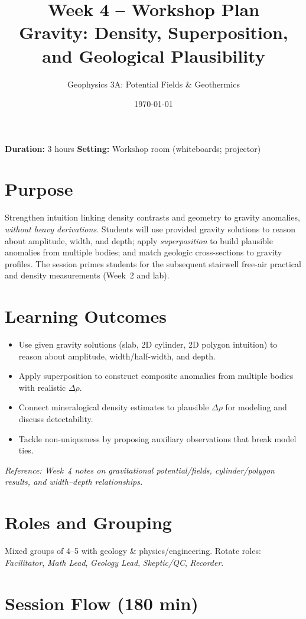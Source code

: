 \documentclass[11pt,a4paper]{article}
\title{Week 4 -- Workshop Plan\\Gravity: Density, Superposition, and Geological Plausibility}
\author{Geophysics 3A: Potential Fields \& Geothermics}
\date{\today}
\begin{document}
\maketitle
\vspace{-0.75em}
\noindent\textbf{Duration:} 3 hours \hfill \textbf{Setting:} Workshop room (whiteboards; projector)

\section*{Purpose}
Strengthen intuition linking density contrasts and geometry to gravity anomalies, \emph{without heavy derivations}. Students will use provided gravity solutions to reason about amplitude, width, and depth; apply \emph{superposition} to build plausible anomalies from multiple bodies; and match geologic cross-sections to gravity profiles. The session primes students for the subsequent stairwell free-air practical and density measurements (Week~2 and lab).

\section*{Learning Outcomes}
\begin{itemize}
  \item Use given gravity solutions (slab, 2D cylinder, 2D polygon intuition) to reason about amplitude, width/half-width, and depth.
  \item Apply superposition to construct composite anomalies from multiple bodies with realistic $\Delta\rho$.
  \item Connect mineralogical density estimates to plausible $\Delta\rho$ for modeling and discuss detectability.
  \item Tackle non-uniqueness by proposing auxiliary observations that break model ties.
\end{itemize}
\textit{Reference: Week~4 notes on gravitational potential/fields, cylinder/polygon results, and width--depth relationships.}

\section*{Roles and Grouping}
Mixed groups of 4--5 with geology \& physics/engineering. Rotate roles: \emph{Facilitator}, \emph{Math Lead}, \emph{Geology Lead}, \emph{Skeptic/QC}, \emph{Recorder}.

\section*{Session Flow (180 min)}
\end{document}
